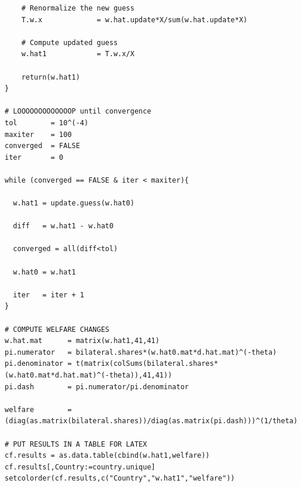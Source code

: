 \documentclass[12pt]{article}
\begin{document}
\begin{verbatim}
    # Renormalize the new guess
    T.w.x             = w.hat.update*X/sum(w.hat.update*X)
    
    # Compute updated guess
    w.hat1            = T.w.x/X

    return(w.hat1)
}   

# LOOOOOOOOOOOOOP until convergence
tol        = 10^(-4) 
maxiter    = 100
converged  = FALSE 
iter       = 0

while (converged == FALSE & iter < maxiter){
  
  w.hat1 = update.guess(w.hat0)
  
  diff   = w.hat1 - w.hat0
  
  converged = all(diff<tol)
  
  w.hat0 = w.hat1
  
  iter   = iter + 1
}

# COMPUTE WELFARE CHANGES
w.hat.mat      = matrix(w.hat1,41,41)
pi.numerator   = bilateral.shares*(w.hat0.mat*d.hat.mat)^(-theta)
pi.denominator = t(matrix(colSums(bilateral.shares*(w.hat0.mat*d.hat.mat)^(-theta)),41,41))
pi.dash        = pi.numerator/pi.denominator

welfare        = (diag(as.matrix(bilateral.shares))/diag(as.matrix(pi.dash)))^(1/theta)

# PUT RESULTS IN A TABLE FOR LATEX
cf.results = as.data.table(cbind(w.hat1,welfare))
cf.results[,Country:=country.unique]
setcolorder(cf.results,c("Country","w.hat1","welfare"))
\end{verbatim}
\end{document}
